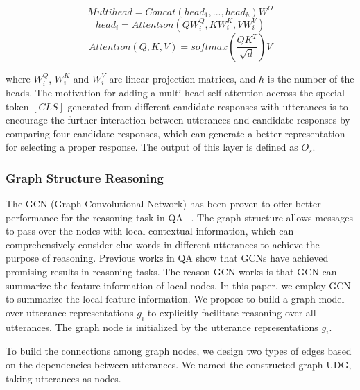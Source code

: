 \documentclass[letterpaper]{article} %
\begin{document}
\begin{equation}
Multihead=Concat(head_1,...,head_h) W^O
\end{equation}
\begin{equation}
head_i=Attention(Q W_i^Q,KW_i^K,VW_i^V)
\end{equation}
\begin{equation}
Attention(Q,K,V)=softmax(\frac{QK^T}{\sqrt{d}}) V
\end{equation}

where $W_i^Q$, $W_i^K$ and $W_i^V$ are linear projection matrices, and $h$ is the number of the heads. The motivation for adding a multi-head self-attention accross the special token $[CLS]$ generated from different candidate responses with utterances is to encourage the further interaction between utterances and candidate responses by comparing four candidate responses, which can generate a better representation for selecting a proper response. The output of this layer is defined as $O_s$.

\subsubsection{Graph Structure Reasoning}
The GCN (Graph Convolutional Network) has been proven to offer better performance for the reasoning task in QA ~\cite{Martin,Fang2019,Qiu2020}. The graph structure allows messages to pass over the nodes with local contextual information, which can comprehensively consider clue words in different utterances to achieve the purpose of reasoning. Previous works in QA show that GCNs have achieved promising results in reasoning tasks. The reason GCN works is that GCN can summarize the feature information of local nodes. In this paper, we employ GCN to summarize the local feature information. We propose to build a graph model over utterance representations $g_i$ to explicitly facilitate reasoning over all utterances. The graph node is initialized by the utterance representations $g_i$.

To build the connections among graph nodes, we design two types of edges based on the dependencies between utterances. We named the constructed graph UDG, taking utterances as nodes.
\end{document}
